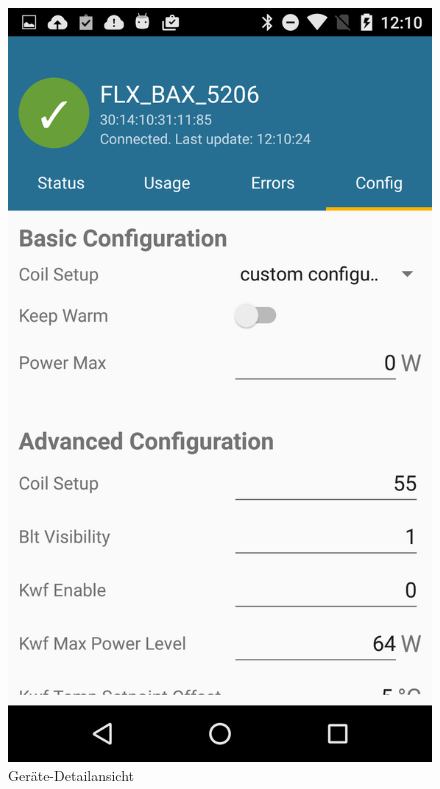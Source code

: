 \begin{figure}[h!]
    \includegraphics[scale=0.09]{results/res/device_config}
    \caption{Geräte-Detailansicht}
\end{figure}


